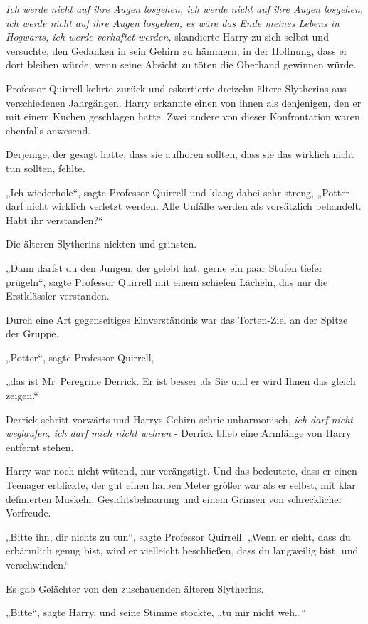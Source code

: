 {\emph{Ich werde nicht auf ihre Augen losgehen, ich werde nicht auf ihre Augen losgehen, ich werde nicht auf ihre Augen losgehen, es wäre das Ende meines Lebens in Hogwarts, ich werde verhaftet werden,} skandierte Harry zu sich selbst und versuchte, den Gedanken in sein Gehirn zu hämmern, in der Hoffnung, dass er dort bleiben würde, wenn seine Absicht zu töten die Oberhand gewinnen würde.

Professor Quirrell kehrte zurück und eskortierte dreizehn ältere Slytherins aus verschiedenen Jahrgängen. Harry erkannte einen von ihnen als denjenigen, den er mit einem Kuchen geschlagen hatte. Zwei andere von dieser Konfrontation waren ebenfalls anwesend.

Derjenige, der gesagt hatte, dass sie aufhören sollten, dass sie das wirklich nicht tun sollten, fehlte.

„Ich wiederhole“, sagte Professor Quirrell und klang dabei sehr streng, „Potter darf nicht wirklich verletzt werden. Alle Unfälle werden als vorsätzlich behandelt. Habt ihr verstanden?“

Die älteren Slytherins nickten und grinsten.

„Dann darfst du den Jungen, der gelebt hat, gerne ein paar Stufen tiefer prügeln“, sagte Professor Quirrell mit einem schiefen Lächeln, das nur die Erstklässler verstanden.

Durch eine Art gegenseitiges Einverständnis war das Torten-Ziel an der Spitze der Gruppe.

„Potter“, sagte Professor Quirrell,

„das ist Mr~Peregrine Derrick. Er ist besser als Sie und er wird Ihnen das gleich zeigen.“

Derrick schritt vorwärts und Harrys Gehirn schrie unharmonisch, \emph{ich darf nicht weglaufen, ich darf mich nicht wehren} - Derrick blieb eine Armlänge von Harry entfernt stehen.

Harry war noch nicht wütend, nur verängstigt. Und das bedeutete, dass er einen Teenager erblickte, der gut einen halben Meter größer war als er selbst, mit klar definierten Muskeln, Gesichtsbehaarung und einem Grinsen von schrecklicher Vorfreude.

„Bitte ihn, dir nichts zu tun“, sagte Professor Quirrell. „Wenn er sieht, dass du erbärmlich genug bist, wird er vielleicht beschließen, dass du langweilig bist, und verschwinden.“

Es gab Gelächter von den zuschauenden älteren Slytherins.

„Bitte“, sagte Harry, und seine Stimme stockte, „tu mir nicht weh…“

}
